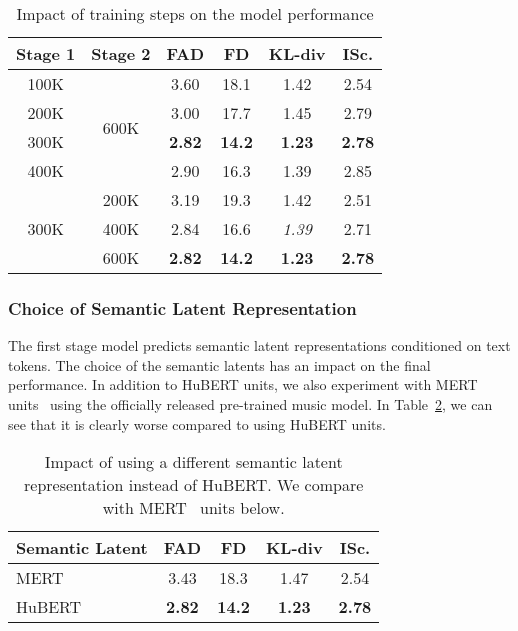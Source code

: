 \begin{table}[h]
\caption{Impact of training steps on the model performance}
\label{tab:iter-tuning}
\begin{center}
\begin{small}
\begin{sc}
\begin{tabular}{cccccc}
\toprule
Stage 1 & Stage 2 & FAD & FD & KL-div & ISc. \\
\midrule
100K & \multirow{4}{*}{600K} & 3.60 & 18.1 & 1.42  & 2.54 \\
200K & & 3.00 & 17.7  & 1.45 & 2.79 \\
300K & & \textbf{2.82} & \textbf{14.2} & \textbf{1.23}& \textbf{2.78} \\
400K & & 2.90 & {16.3} & {1.39} & 2.85  \\
\midrule
\multirow{3}{*}{300K} & 200K & 3.19 & 19.3 & 1.42 & 2.51 \\
 & 400K & 2.84 & 16.6 & \textit{1.39} & 2.71 \\
  & 600K & \textbf{2.82} & \textbf{14.2} & \textbf{1.23}& \textbf{2.78} \\
\bottomrule
\end{tabular}
\end{sc}
\end{small}
\end{center}
\vskip -0.1in
\end{table}

\subsubsection{Choice of Semantic Latent Representation} 
The first stage model predicts semantic latent representations conditioned on text tokens. The choice of the semantic latents has an impact on  the final performance. In addition to HuBERT units, we also experiment with MERT units~\cite{mert} using the officially released pre-trained music model. In Table~\ref{tab:semantic_latents}, we can see that it is clearly worse compared to using HuBERT units.

\begin{table}[htp]
\caption{Impact of using a different semantic latent representation instead of HuBERT. We compare with MERT~\cite{mert} units below.}
\label{tab:semantic_latents}
\begin{center}
\begin{small}
\begin{sc}
\begin{tabular}{lcccc}
\toprule
Semantic Latent & FAD & FD & KL-div & ISc. \\
\midrule
MERT & 3.43 & 18.3 & 1.47  & 2.54 \\
HuBERT & \textbf{2.82} & \textbf{14.2} & \textbf{1.23}& \textbf{2.78} \\
\bottomrule
\end{tabular}
\end{sc}
\end{small}
\end{center}
\vskip -0.1in
\end{table}

